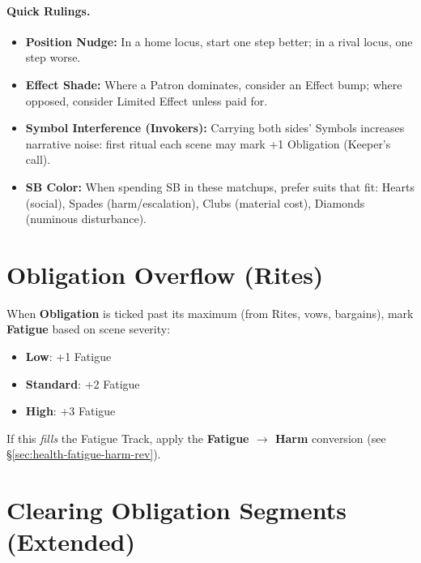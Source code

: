 \paragraph{Quick Rulings.}
\begin{itemize}
  \item \textbf{Position Nudge:} In a home locus, start one step better; in a rival locus, one step worse.
  \item \textbf{Effect Shade:} Where a Patron dominates, consider an Effect bump; where opposed, consider Limited Effect unless paid for.
  \item \textbf{Symbol Interference (Invokers):} Carrying both sides’ Symbols increases narrative noise: first ritual each scene may mark +1 Obligation (Keeper’s call).
  \item \textbf{SB Color:} When spending SB in these matchups, prefer suits that fit: Hearts (social), Spades (harm/escalation), Clubs (material cost), Diamonds (numinous disturbance).
\end{itemize}

\section{Obligation Overflow (Rites)}
\label{sec:obligation-overflow}

When \textbf{Obligation} is ticked past its maximum (from Rites, vows, bargains), mark \textbf{Fatigue} based on scene severity:
\begin{itemize}
  \item \textbf{Low}: +1 Fatigue
  \item \textbf{Standard}: +2 Fatigue
  \item \textbf{High}: +3 Fatigue
\end{itemize}
If this \emph{fills} the Fatigue Track, apply the \textbf{Fatigue $\rightarrow$ Harm} conversion (see \S\ref{sec:health-fatigue-harm-rev}).


\section{Clearing Obligation Segments (Extended)}\label{sec:obligation-clearing-extended}

